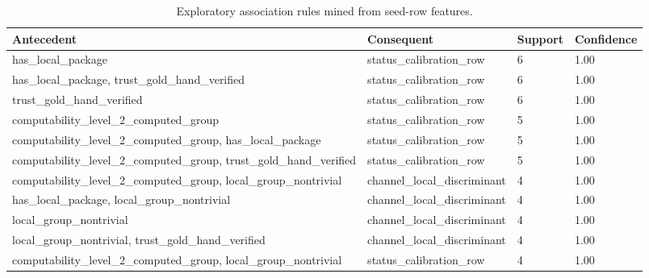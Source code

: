 \begin{table}[h]
\centering
\caption{Exploratory association rules mined from seed-row features.}
\label{tab:association-rules}
\footnotesize
\begin{tabular}{|p{}|p{}|p{}|p{}|}
\hline
Antecedent & Consequent & Support & Confidence \\
\hline
has\_\allowbreak{}local\_\allowbreak{}package & status\_\allowbreak{}calibration\_\allowbreak{}row & 6 & 1.00 \\
has\_\allowbreak{}local\_\allowbreak{}package, trust\_\allowbreak{}gold\_\allowbreak{}hand\_\allowbreak{}verified & status\_\allowbreak{}calibration\_\allowbreak{}row & 6 & 1.00 \\
trust\_\allowbreak{}gold\_\allowbreak{}hand\_\allowbreak{}verified & status\_\allowbreak{}calibration\_\allowbreak{}row & 6 & 1.00 \\
computability\_\allowbreak{}level\_\allowbreak{}2\_\allowbreak{}computed\_\allowbreak{}group & status\_\allowbreak{}calibration\_\allowbreak{}row & 5 & 1.00 \\
computability\_\allowbreak{}level\_\allowbreak{}2\_\allowbreak{}computed\_\allowbreak{}group, has\_\allowbreak{}local\_\allowbreak{}package & status\_\allowbreak{}calibration\_\allowbreak{}row & 5 & 1.00 \\
computability\_\allowbreak{}level\_\allowbreak{}2\_\allowbreak{}computed\_\allowbreak{}group, trust\_\allowbreak{}gold\_\allowbreak{}hand\_\allowbreak{}verified & status\_\allowbreak{}calibration\_\allowbreak{}row & 5 & 1.00 \\
computability\_\allowbreak{}level\_\allowbreak{}2\_\allowbreak{}computed\_\allowbreak{}group, local\_\allowbreak{}group\_\allowbreak{}nontrivial & channel\_\allowbreak{}local\_\allowbreak{}discriminant & 4 & 1.00 \\
has\_\allowbreak{}local\_\allowbreak{}package, local\_\allowbreak{}group\_\allowbreak{}nontrivial & channel\_\allowbreak{}local\_\allowbreak{}discriminant & 4 & 1.00 \\
local\_\allowbreak{}group\_\allowbreak{}nontrivial & channel\_\allowbreak{}local\_\allowbreak{}discriminant & 4 & 1.00 \\
local\_\allowbreak{}group\_\allowbreak{}nontrivial, trust\_\allowbreak{}gold\_\allowbreak{}hand\_\allowbreak{}verified & channel\_\allowbreak{}local\_\allowbreak{}discriminant & 4 & 1.00 \\
computability\_\allowbreak{}level\_\allowbreak{}2\_\allowbreak{}computed\_\allowbreak{}group, local\_\allowbreak{}group\_\allowbreak{}nontrivial & status\_\allowbreak{}calibration\_\allowbreak{}row & 4 & 1.00 \\

\end{tabular}
\end{table}
